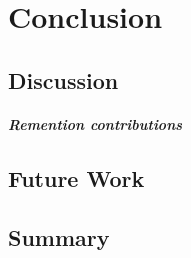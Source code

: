 \chapter{Conclusion}\label{\positionnumber}

\section{Discussion}\label{\positionnumber}
\paragraph{Remention contributions}
\section{Future Work}\label{\positionnumber}
\section{Summary}\label{\positionnumber}

